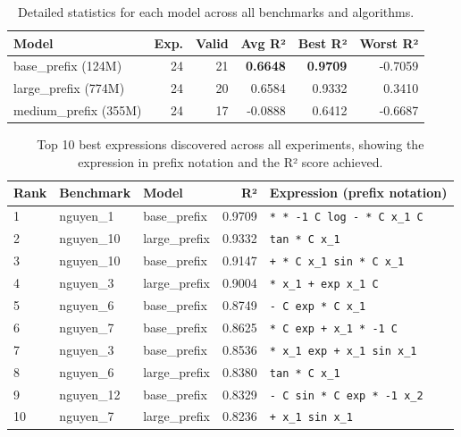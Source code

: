 \begin{table}[h]
\centering
\caption{Detailed statistics for each model across all benchmarks and algorithms.}
\label{tab:model_statistics}
\begin{tabular}{lrrrrr}
\toprule
\textbf{Model} & \textbf{Exp.} & \textbf{Valid} & \textbf{Avg R²} & \textbf{Best R²} & \textbf{Worst R²} \\
\midrule
base\_prefix (124M)   & 24 & 21 & \textbf{0.6648} & \textbf{0.9709} & -0.7059 \\
large\_prefix (774M)  & 24 & 20 & 0.6584 & 0.9332 & 0.3410 \\
medium\_prefix (355M) & 24 & 17 & -0.0888 & 0.6412 & -0.6687 \\
\bottomrule
\end{tabular}
\end{table}

\begin{table}[t]
\centering
\caption{Top 10 best expressions discovered across all experiments, showing the expression in prefix notation and the R² score achieved.}
\label{tab:best_expressions}
\small
\begin{tabular}{lllrp{6cm}}
\toprule
\textbf{Rank} & \textbf{Benchmark} & \textbf{Model} & \textbf{R²} & \textbf{Expression (prefix notation)} \\
\midrule
1  & nguyen\_1  & base\_prefix  & 0.9709 & \texttt{* * -1 C log - * C x\_1 C} \\
2  & nguyen\_10 & large\_prefix & 0.9332 & \texttt{tan * C x\_1} \\
3  & nguyen\_10 & base\_prefix  & 0.9147 & \texttt{+ * C x\_1 sin * C x\_1} \\
4  & nguyen\_3  & large\_prefix & 0.9004 & \texttt{* x\_1 + exp x\_1 C} \\
5  & nguyen\_6  & base\_prefix  & 0.8749 & \texttt{- C exp * C x\_1} \\
6  & nguyen\_7  & base\_prefix  & 0.8625 & \texttt{* C exp + x\_1 * -1 C} \\
7  & nguyen\_3  & base\_prefix  & 0.8536 & \texttt{* x\_1 exp + x\_1 sin x\_1} \\
8  & nguyen\_6  & large\_prefix & 0.8380 & \texttt{tan * C x\_1} \\
9  & nguyen\_12 & base\_prefix  & 0.8329 & \texttt{- C sin * C exp * -1 x\_2} \\
10 & nguyen\_7  & large\_prefix & 0.8236 & \texttt{+ x\_1 sin x\_1} \\
\bottomrule
\end{tabular}
\end{table}

